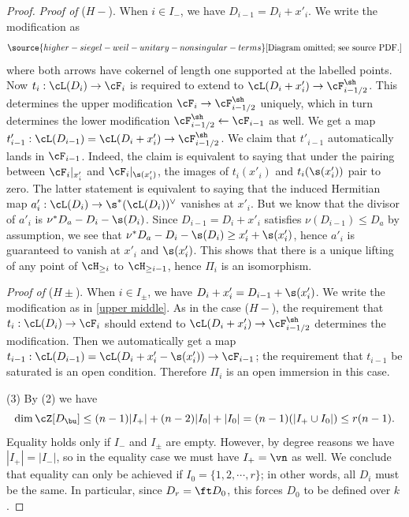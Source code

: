 \begin{proof}
\emph{Proof of} ($H-$). When $i\in I_{-}$, we have $D_{i-1}=D_{i}+x'_{i}$. We write the modification as
\begin{equation}\label{upper middle}
\source{higher-siegel-weil-unitary-nonsingular-terms}
\text{[Diagram omitted; see source PDF.]}
\end{equation}
where both arrows have cokernel of length one supported at the labelled points. Now $t_{i}: \cL(D_{i})\to \cF_{i}$ is required to extend to $\cL(D_{i}+x'_{i})\to \cF^{\sh}_{i-1/2}$. This determines the upper modification $\cF_{i}\to \cF^{\sh}_{i-1/2}$ uniquely, which in turn determines the lower modification $\cF^{\sh}_{i-1/2}\leftarrow \cF_{i-1}$ as well. We get a map $t'_{i-1}: \cL(D_{i-1})=\cL(D_{i}+x'_{i})\to \cF^{\sh}_{i-1/2}$. We claim that $t'_{i-1}$ automatically lands in $\cF_{i-1}$. Indeed, the claim is equivalent to saying that under the pairing between $\cF_{i}|_{x'_{i}}$ and $\cF_{i}|_{\s(x'_{i})}$, the images of $t_{i}(x'_{i})$ and $t_{i}(\s(x'_{i}))$ pair to zero. The latter statement is equivalent to saying that the induced Hermitian map $a'_{i}: \cL(D_{i})\to \s^{*}(\cL(D_{i}))^{\vee}$ vanishes at $x'_{i}$. But we know that the divisor of $a'_{i}$ is $\nu^{*}D_{a}-D_{i}-\s(D_{i})$. Since $D_{i-1}=D_{i}+x'_{i}$ satisfies $\nu(D_{i-1})\le D_{a}$ by assumption, we see that $\nu^{*}D_{a}-D_{i}-\s(D_{i})\ge x'_{i}+\s(x'_{i})$, hence $a'_{i}$ is guaranteed to vanish at $x'_{i}$ and $\s(x'_{i})$. This shows that there is a unique lifting of any point of $\cH_{\ge i}$ to $\cH_{\ge i-1}$, hence $\Pi_{i}$ is an isomorphism.

\emph{Proof of} ($H\pm$). When $i\in I_{\pm}$, we have $D_{i}+x'_{i}=D_{i-1}+\s(x'_{i})$. We write the modification as in \eqref{upper middle}. As in the case ($H-$), the requirement that $t_{i}: \cL(D_{i})\to \cF_{i}$ should extend to $\cL(D_{i}+x'_{i})\to \cF^{\sh}_{i-1/2}$ determines the modification. Then we automatically get a map $t_{i-1}: \cL(D_{i-1})=\cL(D_{i}+x'_{i}-\s(x'_{i}))\to \cF_{i-1}$; the requirement that $t_{i-1}$ be saturated is an open condition. Therefore $\Pi_{i}$ is an open immersion in this case.

(3) By (2) we have
\[
\dim \cZ[D_{\bu}]\le (n-1)|I_{+}|+(n-2)|I_{0}|+|I_{0}|=(n-1)(|I_{+}\cup I_{0}|)\le r(n-1).
\]
Equality holds only if $I_{-}$ and $I_{\pm}$ are empty. However, by degree reasons we have $|I_{+}|=|I_{-}|$, so in the equality case we must have $I_{+}=\vn$ as well. We conclude that equality can only be achieved if $I_{0}=\{1,2,\cdots, r\}$; in other words, all $D_{i}$ must be the same. In particular, since $D_r = \ft D_0$, this forces $D_0$ to be defined over $k$.
\end{proof}

